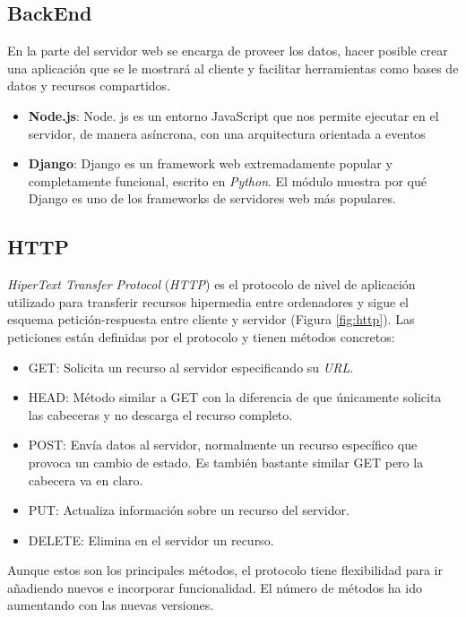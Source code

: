 \subsection{BackEnd}
\label{subsec:backend}
En la parte del servidor web se encarga de proveer los datos, hacer posible crear una aplicación que se le mostrará al cliente y facilitar herramientas como bases de datos y recursos compartidos. 
\begin{itemize}
    \item \textbf{Node.js}: Node. js es un entorno JavaScript que nos permite ejecutar en el servidor, de manera asíncrona, con una arquitectura orientada a eventos   
    \item \textbf{Django}: Django es un framework web extremadamente popular y completamente funcional, escrito en  \textit{Python}. El módulo muestra por qué Django es uno de los frameworks de servidores web más populares.
\end{itemize}

\subsection{HTTP}
\label{subsec:http}

\textit{HiperText Transfer Protocol} (\textit{HTTP}) es el protocolo de nivel de aplicación utilizado para transferir recursos hipermedia entre ordenadores y sigue el esquema petición-respuesta entre cliente y servidor (Figura \ref{fig:http}). 
Las peticiones están definidas por el protocolo y tienen métodos concretos: 
\begin{itemize}
    \item GET: Solicita un recurso al servidor especificando su \textit{URL}.
    \item HEAD: Método similar a GET con la diferencia de que únicamente solicita las cabeceras y no descarga el recurso completo.
    \item POST: Envía datos al servidor, normalmente un recurso específico que provoca un cambio de estado. Es también bastante similar GET pero la cabecera va en claro. 
    \item PUT: Actualiza información sobre un recurso del servidor. 
    \item DELETE: Elimina en el servidor un recurso.
\end{itemize}

Aunque estos son los principales métodos, el protocolo tiene flexibilidad para ir añadiendo nuevos e incorporar funcionalidad. El número de métodos ha ido aumentando con las nuevas versiones.\newline




